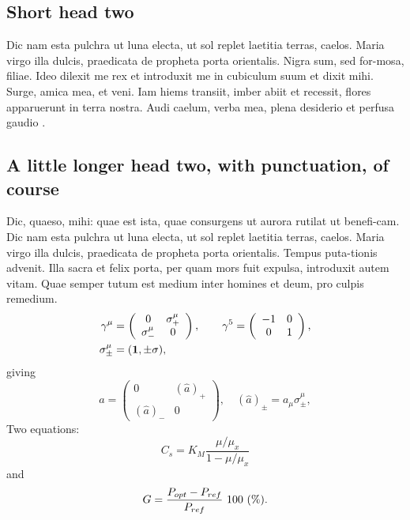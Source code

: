 \documentclass{jdsart}
\theoremstyle{plain}
\theoremstyle{remark}
\theoremstyle{definition}
\begin{document}
\subsection{Short head two}

Dic nam esta pulchra ut luna electa, ut sol replet laetitia terras,
caelos. Maria virgo illa dulcis, praedicata de propheta porta
orientalis. Nigra sum, sed for-mosa, filiae. Ideo dilexit me rex et \cite{Pozd:etal:2017}
introduxit me in cubiculum suum et dixit mihi. Surge, amica mea, et
veni. Iam hiems transiit, imber abiit et recessit, flores apparuerunt in
terra nostra. Audi caelum, verba mea, plena desiderio et perfusa gaudio \cite{gamado2017estimation,gamado2014modelling}.

\subsection{A little longer head two, with punctuation, of course}

Dic, quaeso, mihi: quae est ista, quae consurgens ut aurora rutilat
ut benefi-cam.  Dic nam esta pulchra ut luna electa, ut sol replet
laetitia terras, caelos.  Maria virgo illa dulcis, praedicata de
propheta porta orientalis. Tempus puta-tionis advenit. Illa sacra et
felix porta, per quam mors fuit expulsa, introduxit autem vitam. Quae
semper tutum est medium inter homines et deum, pro culpis remedium.
%
\begin{align}
\gamma^\mu & =
\left(
%
\begin{array}{cc}
0            & \sigma^\mu_+ \\
\sigma^\mu_- & 0            
\end{array}
%
\right),
\qquad
\gamma^5= \left(
%
\begin{array}{cc}
-1 & 0 \\
0  & 1
\end{array}
%
\right),\nonumber\\
\sigma^\mu_{\pm} & = ({\bf1} ,\pm\sigma) , \nonumber
\end{align}
%
giving
%
\begin{equation}
\hat a= \left(
%
\begin{array}{cc}
0          & (\hat a)_+ \\
(\hat a)_- & 0
\end{array}
%
\right),\quad(\hat a)_\pm=a_\mu\sigma^\mu_\pm,
\end{equation}
%
Two equations:
%
\begin{equation}
C_{s} = K_{M} \frac{\mu/\mu_{x}}{1-\mu/\mu_{x}} \label{ccs}
\end{equation}
%
and
%
\begin{equation}
G = \frac{P_{\rm opt} - P_{\rm ref}}{P_{\rm ref}}\ 100\ (\%).
\end{equation}
\end{document}

